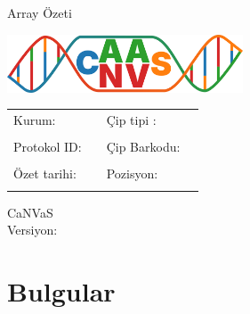 \documentclass{article}
\newcommand{\institute}{
}
\newcommand{\protocolId}{
}
\newcommand{\summaryDate}{
}
\newcommand{\chipId}{
}
\newcommand{\chipPosition}{
}
\newcommand{\chipType}{
}
\newcommand{\canvasVersion}{
}
\begin{document}
\shorthandoff{=}

\begin{titlepage}
\begin{center}
\Huge \textsf{Array Özeti}
\end{center}
\vspace*{2cm}
\begin{center}
\includegraphics[width=7cm]{canvas_logo.png}

\vspace*{4cm}

\begin{tabular}{l l l l}
\textsf{Kurum: \institute } & \hspace{1cm} & \textsf{Çip tipi : \chipType} \\ \\
\textsf{Protokol ID: \protocolId} & \hspace{1cm} & \textsf{Çip Barkodu: \chipId} \\ \\
\textsf{Özet tarihi: \summaryDate} & \hspace{1cm} & \textsf{Pozisyon: \chipPosition} \\ \\
\end{tabular}

\vspace*{3cm}

\textsf{\LARGE CaNVaS} \\[0.5cm]
\textsf{Versiyon: \canvasVersion}
\end{center}
\end{titlepage}


\section{Bulgular}


%
\end{document}
